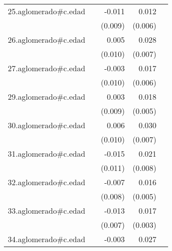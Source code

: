 {\begin{longtable}{l*{4}{D{.}{.}{-1}}}
\addlinespace
25.aglomerado#c.edad&                     &      -0.011         &       0.012         &                     \\
            &                     &     (0.009)         &     (0.006)         &                     \\
\addlinespace
26.aglomerado#c.edad&                     &       0.005         &       0.028\sym{***}&                     \\
            &                     &     (0.010)         &     (0.007)         &                     \\
\addlinespace
27.aglomerado#c.edad&                     &      -0.003         &       0.017\sym{**} &                     \\
            &                     &     (0.010)         &     (0.006)         &                     \\
\addlinespace
29.aglomerado#c.edad&                     &       0.003         &       0.018\sym{***}&                     \\
            &                     &     (0.009)         &     (0.005)         &                     \\
\addlinespace
30.aglomerado#c.edad&                     &       0.006         &       0.030\sym{***}&                     \\
            &                     &     (0.010)         &     (0.007)         &                     \\
\addlinespace
31.aglomerado#c.edad&                     &      -0.015         &       0.021\sym{**} &                     \\
            &                     &     (0.011)         &     (0.008)         &                     \\
\addlinespace
32.aglomerado#c.edad&                     &      -0.007         &       0.016\sym{***}&                     \\
            &                     &     (0.008)         &     (0.005)         &                     \\
\addlinespace
33.aglomerado#c.edad&                     &      -0.013         &       0.017\sym{***}&                     \\
            &                     &     (0.007)         &     (0.003)         &                     \\
\addlinespace
34.aglomerado#c.edad&                     &      -0.003         &       0.027\sym{***}&                     \\

\end{longtable}}
